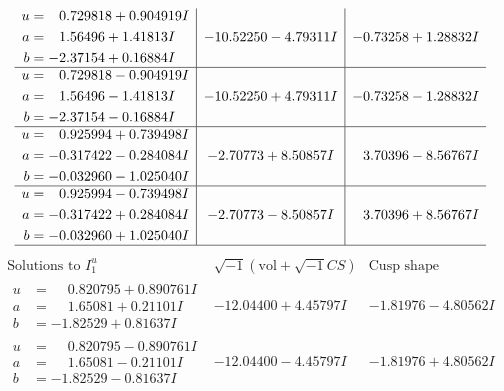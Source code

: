 \documentclass[1p]{elsarticle_modified}
\theoremstyle{definition}
\newcommand{\I}{\sqrt{-1}}
\begin{document}
$$\begin{array}{c|c|c}
\begin{aligned}
u &= \phantom{-}0.729818 + 0.904919 I \\
a &= \phantom{-}1.56496 + 1.41813 I \\
b &= -2.37154 + 0.16884 I\end{aligned}
 & -10.52250 - 4.79311 I & -0.73258 + 1.28832 I \\ \hline\begin{aligned}
u &= \phantom{-}0.729818 - 0.904919 I \\
a &= \phantom{-}1.56496 - 1.41813 I \\
b &= -2.37154 - 0.16884 I\end{aligned}
 & -10.52250 + 4.79311 I & -0.73258 - 1.28832 I \\ \hline\begin{aligned}
u &= \phantom{-}0.925994 + 0.739498 I \\
a &= -0.317422 - 0.284084 I \\
b &= -0.032960 - 1.025040 I\end{aligned}
 & -2.70773 + 8.50857 I & \phantom{-}3.70396 - 8.56767 I \\ \hline\begin{aligned}
u &= \phantom{-}0.925994 - 0.739498 I \\
a &= -0.317422 + 0.284084 I \\
b &= -0.032960 + 1.025040 I\end{aligned}
 & -2.70773 - 8.50857 I & \phantom{-}3.70396 + 8.56767 I\\
 \hline 
 \end{array}$$\newpage$$\begin{array}{c|c|c}  
\text{Solutions to }I^u_{1}& \I (\text{vol} + \sqrt{-1}CS) & \text{Cusp shape}\\
 \hline 
\begin{aligned}
u &= \phantom{-}0.820795 + 0.890761 I \\
a &= \phantom{-}1.65081 + 0.21101 I \\
b &= -1.82529 + 0.81637 I\end{aligned}
 & -12.04400 + 4.45797 I & -1.81976 - 4.80562 I \\ \hline\begin{aligned}
u &= \phantom{-}0.820795 - 0.890761 I \\
a &= \phantom{-}1.65081 - 0.21101 I \\
b &= -1.82529 - 0.81637 I\end{aligned}
 & -12.04400 - 4.45797 I & -1.81976 + 4.80562 I \\ \hline\begin{aligned}

\end{aligned}
\end{array}$$
\end{document}
